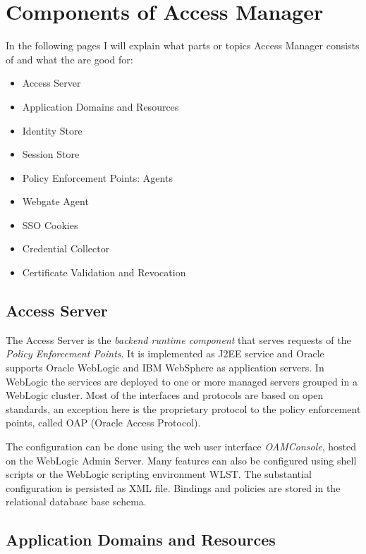 \documentclass[11pt]{report}
\begin{document}
\chapter{Components of Access Manager}

In the following pages I will explain what parts or topics Access
Manager consists of and what the are good for:

\begin{itemize}
    \item Access Server
    \item Application Domains and Resources
    \item Identity Store
    \item Session Store
    \item Policy Enforcement Points: Agents
    \item Webgate Agent
    \item SSO Cookies
    \item Credential Collector
    \item Certificate Validation and Revocation
\end{itemize}




\section{Access Server}

The Access Server is the \emph{backend runtime component} that serves
requests of the \emph{Policy Enforcement Points}. It is implemented as
J2EE service and Oracle supports Oracle WebLogic and IBM WebSphere as
application servers. In WebLogic the services are deployed to one or
more managed servers grouped in a WebLogic cluster.  Most of the
interfaces and protocols are based on open standards, an exception here
is the proprietary protocol to the policy enforcement points, called OAP
(Oracle Access Protocol).

The configuration can be done using the web user interface 
\emph{OAMConsole}, hosted on the WebLogic Admin Server. Many features
can also be configured using shell scripts or the WebLogic scripting
environment WLST\@. The substantial configuration is persisted as XML
file. Bindings and policies are stored in the relational database base
schema.


\section{Application Domains and Resources}
\end{document}
